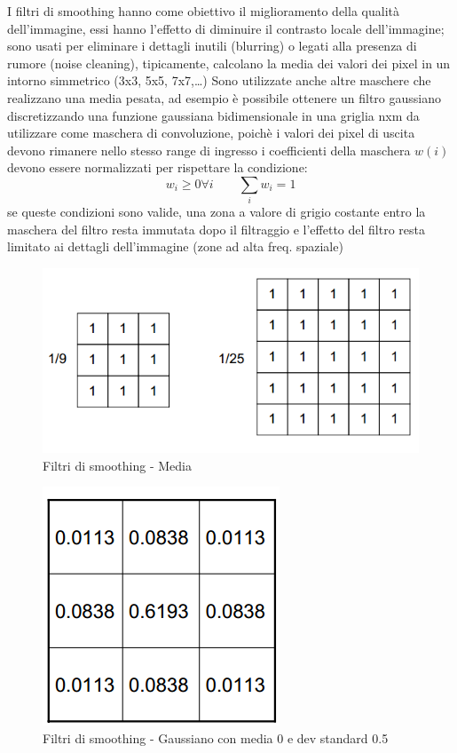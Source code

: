 I filtri di smoothing hanno come obiettivo il miglioramento della qualità 
dell’immagine, essi hanno l’effetto di diminuire il contrasto locale 
dell’immagine; sono usati per eliminare i  dettagli inutili (blurring) o legati alla presenza 
di rumore (noise cleaning), tipicamente, calcolano la media dei valori dei pixel in un 
intorno simmetrico (3x3, 5x5, 7x7,…)
Sono utilizzate anche altre maschere che realizzano una media pesata, ad esempio è
possibile ottenere un filtro gaussiano discretizzando una funzione gaussiana bidimensionale
in una griglia nxm da utilizzare come maschera di convoluzione, poichè i valori dei pixel
di uscita devono rimanere nello stesso range di ingresso i coefficienti della maschera $w(i)$ devono
essere normalizzati per rispettare la condizione:
\[
	w_i \geq 0 \forall i \qquad  	\sum_{i} w_i =1
\]
se queste condizioni sono valide, una zona a valore di grigio 
costante entro la maschera del filtro resta immutata 
dopo il filtraggio e l’effetto del filtro resta limitato ai 
dettagli dell’immagine (zone ad alta freq. spaziale)
\begin{figure}[!h]
\centering
\includegraphics[width=.8\textwidth]{img/kernel-media.png}
\caption{Filtri di smoothing - Media}
\label{fig:kernel-media}
\end{figure}
\begin{figure}[!h]
\centering
\includegraphics[width=.3\textwidth]{img/kernel-gaussiana.png}
\caption{Filtri di smoothing - Gaussiano con media 0 e dev standard 0.5}
\label{fig:kernel-gaussiana}
\end{figure}
